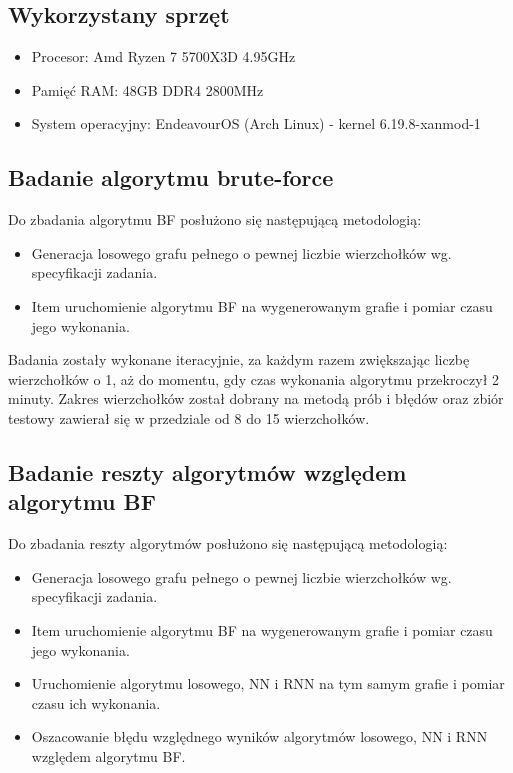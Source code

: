 \documentclass[a4paper,12pt]{article}
\begin{document}
\subsection{Wykorzystany sprzęt}

\begin{itemize}
    \item Procesor: Amd Ryzen 7 5700X3D 4.95GHz
    \item Pamięć RAM: 48GB DDR4 2800MHz
    \item System operacyjny: EndeavourOS (Arch Linux) - kernel 6.19.8-xanmod-1
\end{itemize}

\subsection{Badanie algorytmu brute-force}

Do zbadania algorytmu BF posłużono się następującą metodologią:

\begin{itemize}
    \item Generacja losowego grafu pełnego o pewnej liczbie wierzchołków wg. specyfikacji zadania.
    \item Item uruchomienie algorytmu BF na wygenerowanym grafie i pomiar czasu jego wykonania.
\end{itemize}

Badania zostały wykonane iteracyjnie, za każdym razem zwiększając liczbę wierzchołków o 1, aż do momentu, gdy czas wykonania algorytmu przekroczył 2 minuty.
Zakres wierzchołków został dobrany na metodą prób i błędów oraz zbiór testowy zawierał się w przedziale od 8 do 15 wierzchołków.

\subsection{Badanie reszty algorytmów względem algorytmu BF}

Do zbadania reszty algorytmów posłużono się następującą metodologią:

\begin{itemize}
    \item Generacja losowego grafu pełnego o pewnej liczbie wierzchołków wg. specyfikacji zadania.
    \item Item uruchomienie algorytmu BF na wygenerowanym grafie i pomiar czasu jego wykonania.
    \item Uruchomienie algorytmu losowego, NN i RNN na tym samym grafie i pomiar czasu ich wykonania.
    \item Oszacowanie błędu względnego wyników algorytmów losowego, NN i RNN względem algorytmu BF.
\end{itemize}
\end{document}
